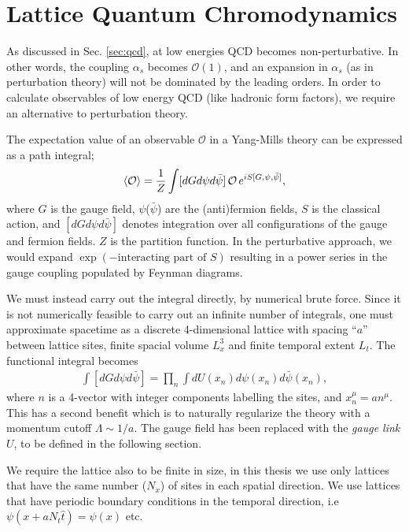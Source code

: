 \chapter{Lattice Quantum Chromodynamics}
\label{chap:latticeqcd}

As discussed in Sec. \ref{sec:qcd}, at low energies QCD becomes non-perturbative. In other words, the coupling $\alpha_s$ becomes $\mathcal{O}(1)$, and an expansion in $\alpha_s$ (as in perturbation theory) will not be dominated by the leading orders. In order to calculate observables of low energy QCD (like hadronic form factors), we require an alternative to perturbation theory.

The expectation value of an observable $\mathcal{O}$ in a Yang-Mills theory can be expressed as a path integral;
\begin{align}
  \langle \mathcal{O} \rangle = {1\over Z}\int [dG d\psi d\bar{\psi}] \, \mathcal{O} \, e^{iS[G,\psi,\bar{\psi}]},
\end{align}
where $G$ is the gauge field, $\psi$($\bar{\psi}$) are the (anti)fermion fields, $S$ is the classical action, and $[dG d\psi d\bar{\psi}]$ denotes integration over all configurations of the gauge and fermion fields. $Z$ is the partition function. In the perturbative approach, we would expand $\exp(-\text{interacting part of }S )$ resulting in a power series in the gauge coupling populated by Feynman diagrams.

We must instead carry out the integral directly, by numerical brute force. Since it is not numerically feasible to carry out an infinite number of integrals, one must approximate spacetime as a discrete 4-dimensional lattice with spacing ``$a$'' between lattice sites, finite spacial volume $L_x^3$ and finite temporal extent $L_t$. The functional integral becomes
\begin{align}
  \int [dG d\psi d\bar{\psi}] = \prod_{n} \int dU(x_n) d\psi(x_n) d\bar{\psi}(x_n),
\end{align}
where $n$ is a 4-vector with integer components labelling the sites, and $x_n^{\mu} = an^{\mu}$.
This has a second benefit which is to naturally regularize the theory with a momentum cutoff $\Lambda \sim 1/a$. The gauge field has been replaced with the {\it{gauge link}} $U$, to be defined in the following section.

We require the lattice also to be finite in size, in this thesis we use only lattices that have the same number ($N_x$) of sites in each spatial direction. We use lattices that have periodic boundary conditions in the temporal direction, i.e $\psi(x+aN_t \hat{t}) = \psi(x)$ etc.

